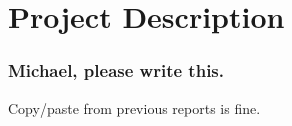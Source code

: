 \section{Project Description}


\begin{frame}
\frametitle{Michael, please write this.}
Copy/paste from previous reports is fine.
\end{frame}
